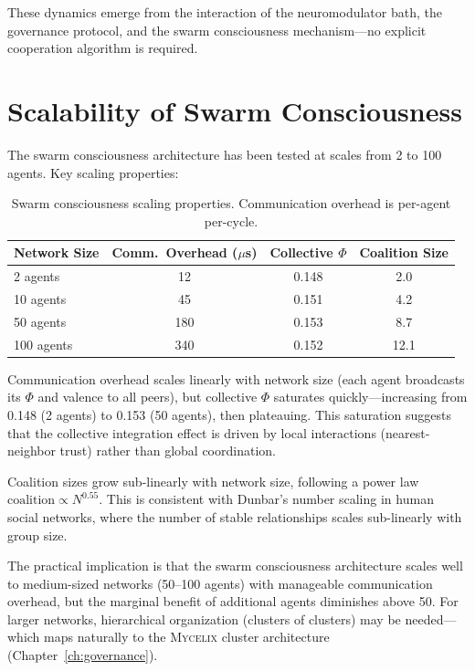 \documentclass[12pt]{book}
\newcommand{\mycelix}{\textsc{Mycelix}}
\begin{document}
These dynamics emerge from the interaction of the neuromodulator bath, the governance protocol, and the swarm consciousness mechanism---no explicit cooperation algorithm is required.

\section{Scalability of Swarm Consciousness}

The swarm consciousness architecture has been tested at scales from 2 to 100 agents. Key scaling properties:

\begin{table}[H]
\centering
\caption{Swarm consciousness scaling properties. Communication overhead is per-agent per-cycle.}
\label{tab:swarm-scaling}
\begin{tabular}{lccc}
\toprule
\textbf{Network Size} & \textbf{Comm.\ Overhead ($\mu$s)} & \textbf{Collective $\Phi$} & \textbf{Coalition Size} \\
\midrule
2 agents & 12 & 0.148 & 2.0 \\
10 agents & 45 & 0.151 & 4.2 \\
50 agents & 180 & 0.153 & 8.7 \\
100 agents & 340 & 0.152 & 12.1 \\
\bottomrule
\end{tabular}
\end{table}

Communication overhead scales linearly with network size (each agent broadcasts its $\Phi$ and valence to all peers), but collective $\Phi$ saturates quickly---increasing from 0.148 (2 agents) to 0.153 (50 agents), then plateauing. This saturation suggests that the collective integration effect is driven by local interactions (nearest-neighbor trust) rather than global coordination.

Coalition sizes grow sub-linearly with network size, following a power law $\text{coalition} \propto N^{0.55}$. This is consistent with Dunbar's number scaling in human social networks, where the number of stable relationships scales sub-linearly with group size.

The practical implication is that the swarm consciousness architecture scales well to medium-sized networks (50--100 agents) with manageable communication overhead, but the marginal benefit of additional agents diminishes above 50. For larger networks, hierarchical organization (clusters of clusters) may be needed---which maps naturally to the \mycelix{} cluster architecture (Chapter~\ref{ch:governance}).
\end{document}
